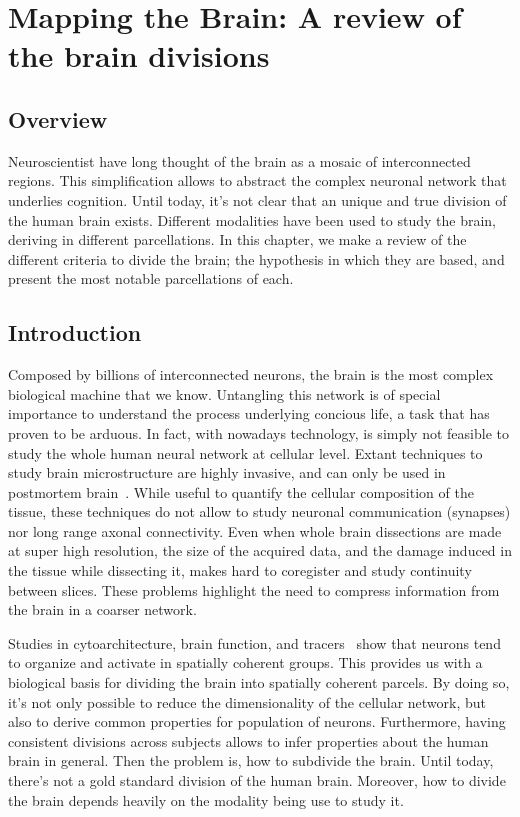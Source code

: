 \chapter{Mapping the Brain: A review of the brain divisions}

\section{Overview}
Neuroscientist have long thought of the brain as a mosaic of interconnected
regions. This simplification allows to abstract the complex neuronal network
that underlies cognition. Until today, it's not clear that an unique and true
division of the human brain exists. Different modalities have been used to
study the brain, deriving in different parcellations. In this chapter, we make
a review of the different criteria to divide the brain; the hypothesis in
which they are based, and present the most notable parcellations of each.


\section{Introduction}
Composed by billions of interconnected neurons, the brain is the most complex
biological machine that we know. Untangling this network is of special importance
to understand the process underlying concious life, a task that has proven to be
arduous. In fact, with nowadays technology, is simply not feasible
to study the whole human neural network at cellular level. Extant techniques to
study brain microstructure are highly invasive, and can only be used in
postmortem brain~\cite{Swanson1982, Schmahmann2006, Amunts2007, Ding2016}.
While useful to quantify the cellular composition of the tissue, these techniques
do not allow to study neuronal communication (synapses) nor long range axonal
connectivity. Even when whole brain dissections are made at super high resolution\cite{Mohlberg2012, Amunts2013, Ding2016},
the size of the acquired data, and the damage induced in the tissue while dissecting it,
makes hard to coregister and study continuity between slices. These problems
highlight the need to compress information from the brain in a coarser network.


Studies in cytoarchitecture\cite{Meynert1872, Brodmann1909, VonEconomo1925}, brain
function\cite{Penfield1954, VonderMalsburg1994}, and tracers~\cite{Schmahmann2006, Stephan2013}
show that neurons tend to organize and activate in spatially coherent groups.
This provides us with a biological basis for dividing the brain into spatially coherent
parcels. By doing so, it's not only possible to reduce the dimensionality of the
cellular network, but also to derive common properties for population of neurons.
Furthermore, having consistent divisions across subjects allows to infer
properties about the human brain in general. Then the problem is, how to
subdivide the brain. Until today, there's not a gold standard division of the
human brain. Moreover, how to divide the brain depends heavily on the modality
being use to study it.

